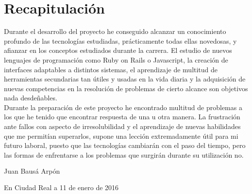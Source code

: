 \section{Recapitulación}
Durante el desarrollo del proyecto he conseguido alcanzar un conocimiento profundo de las tecnologías estudiadas, prácticamente todas ellas novedosas, y afianzar en los conceptos estudiados durante la carrera. El estudio de nuevos lenguajes de programación como Ruby on Rails o Javascript, la creación de interfaces adaptables a distintos sistemas, el aprendizaje de multitud de herramientas secundarias tan útiles y usadas en la vida diaria y la adquisición de nuevas competencias en la resolución de problemas de cierto alcance son objetivos nada desdeñables. \\
Durante la preparación de este proyecto he encontrado multitud de problemas a los que he tenido que encontrar respuesta de una u otra manera. La frustración ante fallos con aspecto de irresolubilidad y el aprendizaje de nuevas habilidades que me permitían superarlos, supone una lección extremadamente útil para mi futuro laboral, puesto que las tecnologías cambiarán con el paso del tiempo, pero las formas de enfrentarse a los problemas que surgirán durante su utilización no.

\hfill Juan Bausá Arpón

\hfill En Ciudad Real a 11 de enero de 2016

